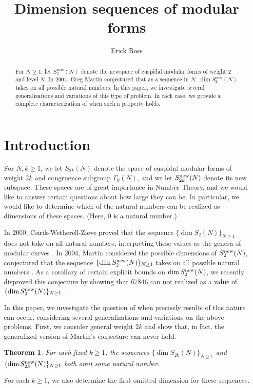 \documentclass[12pt,letterpaper,reqno]{amsart}
\newtheorem{theorem}{Theorem}[section]
\theoremstyle{definition}
\numberwithin{equation}{section}
\numberwithin{figure}{section}
\numberwithin{table}{section}
\newcommand{\nw}{{\textnormal{new}}}
\begin{document}
\title{Dimension sequences of modular forms}



\author[E. Ross]{Erick Ross}
\address[E. Ross]{School of Mathematical and Statistical Sciences, Clemson University, Clemson, SC}

\begin{abstract}
    For $N \geq 1$, let $S_{2}^{\text{new}}(N)$ denote the newspace of cuspidal modular forms of weight $2$ and level $N$. In 2004, Greg Martin conjectured that as a sequence in $N$, $\dim S_2^{\text{new}}(N)$ takes on all possible natural numbers. In this paper, we investigate several generalizations and variations of this type of problem. In each case, we provide a complete characterization of when such a property holds.
\end{abstract}

\maketitle


\section{Introduction} \label{sec:intro}

For $N,k\geq1$, we let $S_{2k}(N)$ denote the space of cuspidal modular forms of weight $2k$ and congruence subgroup $\Gamma_0(N)$, and we let $S_{2k}^\nw(N)$ denote its new subspace.
These spaces are of great importance in Number Theory, and we would like to answer certain questions about how large they can be.
In particular, we would like to determine which of the natural numbers can be realized as dimensions of these spaces. (Here, $0$ is a natural number.)

In 2000, Csirik-Wetherell-Zieve proved that the sequence $\{\dim S_2(N)\}_{N\ge1}$ does not take on all natural numbers, interpreting these values as the genera of modular curves \cite[Section 4]{csirik}. 
In 2004, Martin considered the possible dimensions of $S_2^\nw(N)$, conjectured that the sequence $\{\dim S_2^\nw(N)\}_{N\ge1}$ takes on all possible natural numbers \cite[Conjecture 27]{martin}. 
As a corollary of certain explicit bounds on $\dim S_2^\nw(N)$, we recently disproved this conjecture by showing that $67846$ can not realized as a value of $\{\dim S_2^\nw(N)\}_{N\ge1}$ \cite[Section 7]{ross}.

In this paper, we investigate the question of when precisely results of this nature can occur, considering several generalizations and variations on the above problems. First, we consider general weight $2k$ and show that, in fact, the generalized version of Martin's conjecture can never hold.
\begin{theorem} \label{thm:N-indexed}
    For each fixed $k \ge 1$, the sequences $\{ \dim S_{2k}(N) \}_{N\ge1}$ and $\{\dim S_{2k}^\nw(N) \}_{N\ge1}$ both omit some natural number.
\end{theorem}
For each $k \ge 1$, we also determine the first omitted dimension for these sequences.
\end{document}
